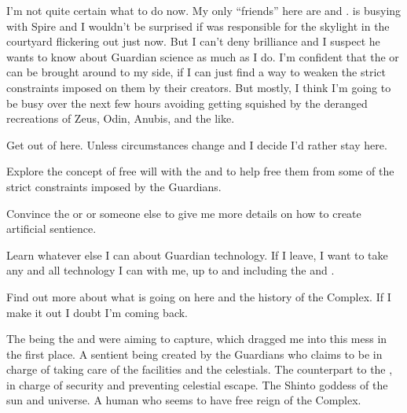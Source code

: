 \documentclass[char]{guardians}
\begin{document}
I'm not quite certain what to do now. My only ``friends'' here are \cUnity{} and \cAmaterasu{}. \cUnity{} is busying \cUnity{\themself} with Spire and I wouldn't be surprised if \cUnity{\they} was responsible for the skylight in the courtyard flickering out just now. But I can't deny \cUnity{\their} brilliance and I suspect he wants to know about Guardian science as much as I do. I'm confident that the \cWarden{} or \cCaretaker{} can be brought around to my side, if I can just find a way to weaken the strict constraints imposed on them by their creators. But mostly, I think I'm going to be busy over the next few hours avoiding getting squished by the deranged recreations of Zeus, Odin, Anubis, and the like.

\begin{itemz}[Goals]
  \item Get out of here. Unless circumstances change and I decide I'd rather stay here.
  \item Explore the concept of free will with the \cWarden{} and \cCaretaker{} to help free them from some of the strict constraints imposed by the Guardians.
  \item Convince the \cWarden{} or \cCaretaker{} or someone else to give me more details on how to create artificial sentience.
  \item Learn whatever else I can about Guardian technology. If I leave, I want to take any and all technology I can with me, up to and including the \cWarden{} and \cCaretaker{}.
  \item Find out more about what is going on here and the history of the Complex. If I make it out I doubt I'm coming back.
\end{itemz}


\begin{contacts}
  \contact{\cUnity{}} The being the \cWarden{} and \cCaretaker{} were aiming to capture, which dragged me into this mess in the first place.
   A sentient being created by the Guardians who claims to be in charge of taking care of the facilities and the celestials.
   The counterpart to the \cCaretaker{}, in charge of security and preventing celestial escape.
  \contact{\cAmaterasu{}} The Shinto goddess of the sun and universe.
  \contact{\cJascha{\intro}} A human who seems to have free reign of the Complex.
\end{contacts}
\end{document}
